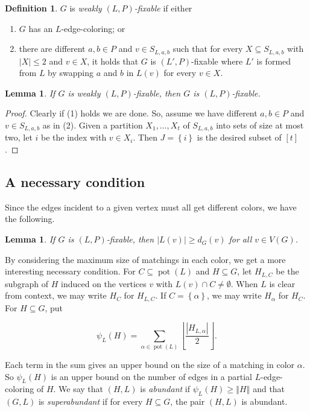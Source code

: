 \documentclass[12pt]{article}
\theoremstyle{plain}
\newtheorem{lem}[thm]{Lemma}
\theoremstyle{definition}
\newtheorem{defn}{Definition}
\theoremstyle{remark}
\newcommand{\set}[1]{\left\{ #1 \right\}}
\newcommand{\card}[1]{\left|#1\right|}
\newcommand{\size}[1]{\left\Vert#1\right\Vert}
\newcommand{\floor}[1]{\left\lfloor#1\right\rfloor}
\newcommand{\irange}[1]{\left[#1\right]}
\newcommand{\pot}{\operatorname{pot}}
\begin{document}
\begin{defn}
$G$ is \emph{weakly $(L, P)$-fixable} if either
\begin{enumerate}
\item[(1)] $G$ has an $L$-edge-coloring; or
\item[(2)] there are different $a,b \in P$ and $v \in S_{L,a,b}$ such that for every $X \subseteq S_{L,a,b}$ with $|X| \le 2$ and $v \in X$, it holds that $G$ is $(L', P)$-fixable where $L'$ is formed from $L$ by swapping $a$ and $b$ in $L(v)$ for every $v \in X$.
\end{enumerate}
\end{defn}

\begin{lem}\label{weaklyfixable}
If $G$ is weakly $(L, P)$-fixable, then $G$ is $(L, P)$-fixable.
\end{lem}
\begin{proof}
Clearly if (1) holds we are done.  So, assume we have different $a,b \in P$ and $v \in S_{L,a,b}$ as in (2). Given a partition $X_1, \ldots, X_t$ of $S_{L,a,b}$ into sets of size at most two, let $i$ be the index with $v \in X_i$.  Then $J = \set{i}$ is the desired subset of $\irange{t}$.
\end{proof}

\subsection{A necessary condition}
Since the edges incident to a given vertex must all get different colors, we have the following.

\begin{lem}\label{DegreeNecessaryCondition}
If $G$ is $(L, P)$-fixable, then $|L(v)| \ge d_G(v)$ for all $v \in V(G)$.
\end{lem}

By considering the maximum size of matchings in each color, we get a more interesting necessary condition.
For $C \subseteq \pot(L)$ and $H \subseteq G$, let $H_{L, C}$ be the
subgraph of $H$ induced on the vertices $v$ with $L(v) \cap C \ne \emptyset$. 
When $L$ is clear from context, we may write $H_C$ for $H_{L,C}$. If $C =
\set{\alpha}$, we may write $H_\alpha$ for $H_C$.  For $H \subseteq G$, put

\[\psi_L(H) = \sum_{\alpha \in \pot(L)} \floor{\frac{\card{H_{L, \alpha}}}{2}}.\]

Each term in the sum gives an upper bound on the size of a matching in color
$\alpha$. So $\psi_L(H)$ is an upper bound on the number of edges in a
partial $L$-edge-coloring of $H$.  We say that $(H, L)$ is \emph{abundant} if
$\psi_L(H) \ge \size{H}$ and that $(G,L)$ is \emph{superabundant} if for every
$H \subseteq G$, the pair $(H, L)$ is abundant.  
\end{document}
